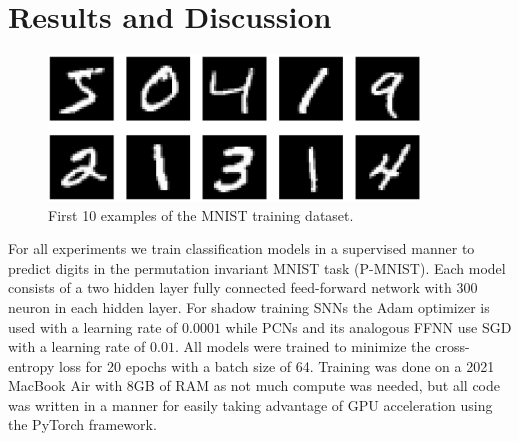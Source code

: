 \documentclass[a4paper,11pt]{article} %
\begin{document}
\newpage

\section{Results and Discussion}
\begin{figure}[ht]
  \centering
  \includegraphics[width=280pt]{graphics/mnist.png}  
  \caption{First 10 examples of the MNIST training dataset.}
  \label{fig:MNIST}
\end{figure}
For all experiments we train classification models in a supervised manner to predict digits in the permutation invariant MNIST task (P-MNIST). Each model consists of a two hidden layer fully connected feed-forward network with 300 neuron in each hidden layer. For shadow training SNNs the Adam optimizer is used with a learning rate of $0.0001$ while PCNs and its analogous FFNN use SGD with a learning rate of $0.01$. All models were trained to minimize the cross-entropy loss for 20 epochs with a batch size of 64. Training was done on a 2021 MacBook Air with 8GB of RAM as not much compute was needed, but all code was written in a manner for easily taking advantage of GPU acceleration using the PyTorch framework. 
\end{document}
